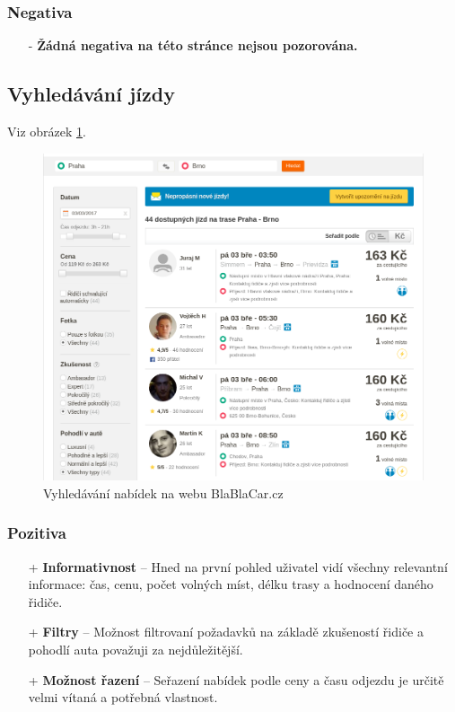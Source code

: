 \subsubsection*{Negativa}
\begin{itemize}
    \item[-] \textbf{Žádná negativa na této stránce nejsou pozorována.}
\end{itemize}



\newpage
\subsection{Vyhledávání jízdy}
Viz obrázek \ref{fig:blablacar:search}.
\begin{figure}[h]
    \centering
    \includegraphics[width=1.0\textwidth]{media/blablacar/search.png}
    \caption{Vyhledávání nabídek na webu BlaBlaCar.cz}
    \label{fig:blablacar:search}
\end{figure}
\subsubsection*{Pozitiva}
\begin{itemize}
    \item[+] \textbf{Informativnost} -- Hned na první pohled uživatel vidí všechny relevantní informace: čas, cenu, počet volných míst, délku trasy a hodnocení daného řidiče.
    \item[+] \textbf{Filtry} -- Možnost filtrovaní požadavků na základě zkušeností řidiče a pohodlí auta považuji za nejdůležitější.
    \item[+] \textbf{Možnost řazení} -- Seřazení nabídek podle ceny a času odjezdu je určitě velmi vítaná a potřebná vlastnost.
\end{itemize}
